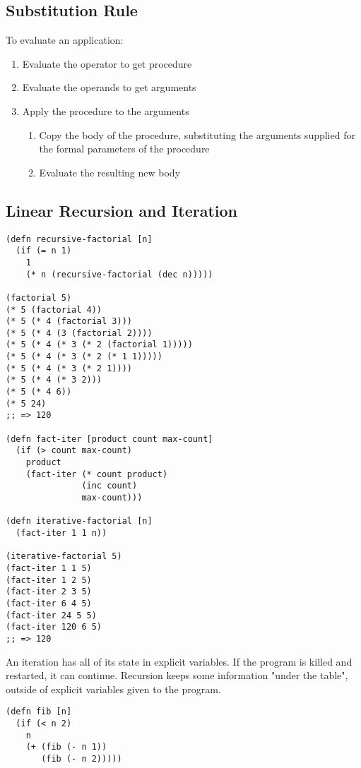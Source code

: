 \documentclass[11pt]{article}
\begin{document}
\subsection{Substitution Rule}
\label{sec-2-1}
To evaluate an application:

\begin{enumerate}
\item Evaluate the operator to get procedure
\item Evaluate the operands to get arguments
\item Apply the procedure to the arguments
\begin{enumerate}
\item Copy the body of the procedure, substituting the arguments supplied for the formal parameters of the procedure
\item Evaluate the resulting new body
\end{enumerate}
\end{enumerate}

\subsection{Linear Recursion and Iteration}
\label{sec-2-2}
\begin{verbatim}
(defn recursive-factorial [n]
  (if (= n 1)
    1
    (* n (recursive-factorial (dec n)))))

(factorial 5)
(* 5 (factorial 4))
(* 5 (* 4 (factorial 3)))
(* 5 (* 4 (3 (factorial 2))))
(* 5 (* 4 (* 3 (* 2 (factorial 1)))))
(* 5 (* 4 (* 3 (* 2 (* 1 1)))))
(* 5 (* 4 (* 3 (* 2 1))))
(* 5 (* 4 (* 3 2)))
(* 5 (* 4 6))
(* 5 24)
;; => 120

(defn fact-iter [product count max-count]
  (if (> count max-count)
    product
    (fact-iter (* count product)
               (inc count)
               max-count)))

(defn iterative-factorial [n]
  (fact-iter 1 1 n))

(iterative-factorial 5)
(fact-iter 1 1 5)
(fact-iter 1 2 5)
(fact-iter 2 3 5)
(fact-iter 6 4 5)
(fact-iter 24 5 5)
(fact-iter 120 6 5)
;; => 120
\end{verbatim}

An iteration has all of its state in explicit variables. If the program is killed and restarted, it can continue. Recursion keeps some information "under the table", outside of explicit variables given to the program. 

\begin{verbatim}
(defn fib [n]
  (if (< n 2)
    n
    (+ (fib (- n 1))
       (fib (- n 2)))))
\end{verbatim}
\end{document}
